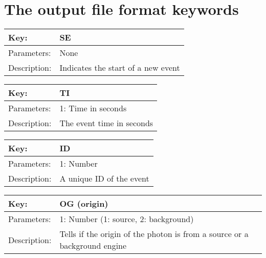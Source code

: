 \chapter{The output file format keywords}

\begin{table}[htdp]
\begin{center}
\begin{tabular}{|p{2cm}|p{12cm}|}
\hline
Key: &	SE\\
\hline
Parameters:	& None\\
\hline
Description:	& Indicates the start of a new event\\
\hline
\end{tabular}
\end{center}
\label{default}
\end{table}

\begin{table}[htdp]
\begin{center}
\begin{tabular}{|p{2cm}|p{12cm}|}
\hline
Key:	&TI\\
\hline
Parameters:&	1: Time in seconds\\
\hline
Description:&	The event time in seconds\\
\hline
\end{tabular}
\end{center}
\end{table}

\begin{table}[htdp]
\begin{center}
\begin{tabular}{|p{2cm}|p{12cm}|}
\hline
Key:	&ID\\
\hline
Parameters:&	1: Number\\
\hline
Description:&	A unique ID of the event\\
\hline
\end{tabular}
\end{center}
\end{table}

\begin{table}[htdp]
\begin{center}
\begin{tabular}{|p{2cm}|p{12cm}|}
\hline
Key:	&OG (origin)\\
\hline
Parameters:&	1: Number (1: source, 2: background)\\
\hline
Description:&	Tells if the origin of the photon is from a source or a background engine\\
\hline
\end{tabular}
\end{center}
\end{table}

